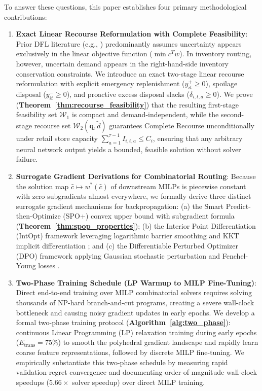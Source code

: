 \documentclass[11pt,a4paper]{article}
\theoremstyle{definition}
\theoremstyle{remark}
\begin{document}
To answer these questions, this paper establishes four primary methodological contributions:
\begin{enumerate}[leftmargin=*]
    \item \textbf{Exact Linear Recourse Reformulation with Complete Feasibility}: Prior DFL literature (e.g., \citet{elmachtoub2022smart,mandi2020interior,tang2024pyepo}) predominantly assumes uncertainty appears exclusively in the linear objective function ($\min c^T w$). In inventory routing, however, uncertain demand appears in the right-hand-side inventory conservation constraints. We introduce an exact two-stage linear recourse reformulation with explicit emergency replenishment ($y_{it}^+ \ge 0$), spoilage disposal ($y_{it}^- \ge 0$), and proactive excess disposal slacks ($\delta_{i,t,a} \ge 0$). We prove (\textbf{Theorem~\ref{thm:recourse_feasibility}}) that the resulting first-stage feasibility set $\mathcal{W}_1$ is compact and demand-independent, while the second-stage recourse set $\mathcal{W}_2(\mathbf{q}, \tilde{d})$ guarantees Complete Recourse unconditionally under retail store capacity $\sum_{a=1}^{\tau-1} I_{i,t,a} \le C_i$, ensuring that any arbitrary neural network output yields a bounded, feasible solution without solver failure.
    \item \textbf{Surrogate Gradient Derivations for Combinatorial Routing}: Because the solution map $\hat{c} \mapsto w^*(\hat{c})$ of downstream MILPs is piecewise constant with zero subgradients almost everywhere, we formally derive three distinct surrogate gradient mechanisms for backpropagation: (a) the Smart Predict-then-Optimize (SPO+) convex upper bound with subgradient formula (\textbf{Theorem~\ref{thm:spop_properties}}); (b) the Interior Point Differentiation (IntOpt) framework leveraging logarithmic barrier smoothing and KKT implicit differentiation \citep{mandi2020interior}; and (c) the Differentiable Perturbed Optimizer (DPO) framework applying Gaussian stochastic perturbation and Fenchel-Young losses \citep{berthet2020learning}.
    \item \textbf{Two-Phase Training Schedule (LP Warmup to MILP Fine-Tuning)}: Direct end-to-end training over MILP combinatorial solvers requires solving thousands of NP-hard branch-and-cut programs, creating a severe wall-clock bottleneck and causing noisy gradient updates in early epochs. We develop a formal two-phase training protocol (\textbf{Algorithm~\ref{alg:two_phase}}): continuous Linear Programming (LP) relaxation training during early epochs ($E_{\text{trans}} = 75\%$) to smooth the polyhedral gradient landscape and rapidly learn coarse feature representations, followed by discrete MILP fine-tuning. We empirically substantiate this two-phase schedule by measuring rapid validation-regret convergence and documenting order-of-magnitude wall-clock speedups ($5.66\times$ solver speedup) over direct MILP training.

\end{enumerate}
\end{document}
